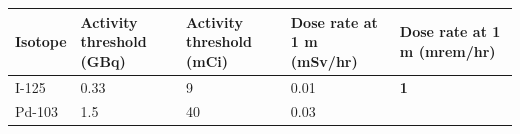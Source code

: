 \documentclass[]{book}
\theoremstyle{definition}
\theoremstyle{definition}
\theoremstyle{definition}
\theoremstyle{remark}
\begin{document}
\begin{longtable}[]{@{}lllll@{}}
\toprule
\begin{minipage}[b]{0.13\columnwidth}\raggedright\strut
Isotope\strut
\end{minipage} & \begin{minipage}[b]{0.13\columnwidth}\raggedright\strut
Activity threshold (GBq)\strut
\end{minipage} & \begin{minipage}[b]{0.13\columnwidth}\raggedright\strut
Activity threshold (mCi)\strut
\end{minipage} & \begin{minipage}[b]{0.13\columnwidth}\raggedright\strut
Dose rate at 1 m (mSv/hr)\strut
\end{minipage} & \begin{minipage}[b]{0.13\columnwidth}\raggedright\strut
Dose rate at 1 m (mrem/hr)\strut
\end{minipage}\tabularnewline
\midrule
\endhead
\begin{minipage}[t]{0.13\columnwidth}\raggedright\strut
I-125\strut
\end{minipage} & \begin{minipage}[t]{0.13\columnwidth}\raggedright\strut
0.33\strut
\end{minipage} & \begin{minipage}[t]{0.13\columnwidth}\raggedright\strut
9\strut
\end{minipage} & \begin{minipage}[t]{0.13\columnwidth}\raggedright\strut
0.01\strut
\end{minipage} & \begin{minipage}[t]{0.13\columnwidth}\raggedright\strut
\textbf{1}\strut
\end{minipage}\tabularnewline
\begin{minipage}[t]{0.13\columnwidth}\raggedright\strut
Pd-103\strut
\end{minipage} & \begin{minipage}[t]{0.13\columnwidth}\raggedright\strut
1.5\strut
\end{minipage} & \begin{minipage}[t]{0.13\columnwidth}\raggedright\strut
40\strut
\end{minipage} & \begin{minipage}[t]{0.13\columnwidth}\raggedright\strut
0.03\strut
\end{minipage} & \begin{minipage}[t]{0.13\columnwidth}\raggedright\strut

\end{minipage}
\end{longtable}
\end{document}

